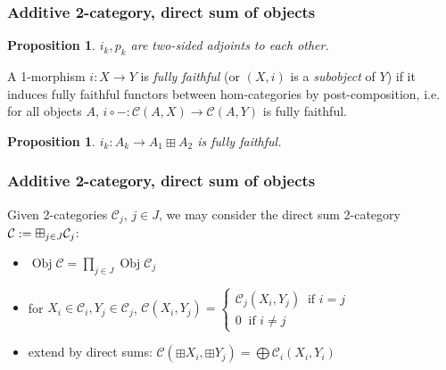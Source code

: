 \documentclass{beamer}
\DeclareMathOperator{\Obj}{Obj}
\newtheorem{proposition}[theorem]{Proposition}
\newcommand{\cC}{{\mathcal{C}}}
\newcommand{\bigboxplus}{\Huge \boxplus}
\begin{document}
\begin{frame}
\frametitle{Additive 2-category, direct sum of objects}

\begin{proposition}
$i_k,p_k$ are two-sided adjoints to each other.
\end{proposition}

\pause

\begin{definition}
A 1-morphism $i: X \to Y$ is \emph{fully faithful}
(or $(X,i)$ is a \emph{subobject} of $Y$)
if it induces fully faithful functors between hom-categories
by post-composition, i.e. for all objects $A$,
$i \circ - : \cC(A,X) \to \cC(A,Y)$
is fully faithful.
\end{definition}

\pause

\begin{proposition}
$i_k: A_k \to A_1 \boxplus A_2$ is fully faithful.
\end{proposition}


\end{frame}
\begin{frame}
\frametitle{Additive 2-category, direct sum of objects}

\begin{definition}
Given 2-categories $\cC_j$, $j \in J$,
we may consider the direct sum 2-category
$\cC := \bigboxplus_{j \in J} \cC_j$:
\begin{itemize}
\item $\Obj \cC = \prod_{j \in J} \Obj \cC_j$

\pause

\item for $X_i \in \cC_i, Y_j \in \cC_j$,
	$\cC(X_i,Y_j) =
\begin{cases}
	\cC_j(X_i,Y_j) \;\; \text{if } i = j
	\\
	0 \;\; \text{if } i \neq j
\end{cases}
$

\pause

\item extend by direct sums:
	$\cC(\boxplus X_i, \boxplus Y_j)
	= \bigoplus \cC_i(X_i, Y_i)$
\end{itemize}
\end{definition}

\end{frame}
\end{document}
